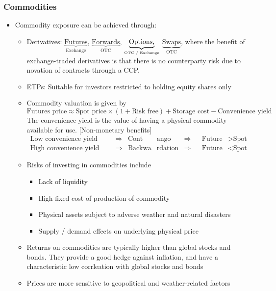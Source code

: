 \documentclass[../notes_compiled.tex]{subfiles}
\begin{document}
\subsubsection{Commodities}
\begin{itemize}
\item Commodity exposure can be achieved through:
\begin{itemize}
\item Derivatives: $\underbrace{\text{Futures}}_{\text{Exchange}}$,  $\underbrace{\text{Forwards}}_{\text{OTC}}$, $\underbrace{\text{Options,}}_{\text{\tiny{OTC / Exchange}}}$ $\underbrace{\text{Swaps}}_{\text{OTC}}$, where the benefit of exchange-traded derivatives is that there is no counterparty risk due to novation of contracts through a CCP.
\item ETPs: Suitable for investors restricted to holding equity shares only
\item Commodity valuation is given by
\small{\begin{equation}
\text{Futures price} \approx \text{Spot price} \times (1 + \text{Risk free}) + \text{Storage cost} - \text{Convenience yield}
\end{equation}}
The convenience yield is the value of having a physical commodity available for use. [Non-monetary benefits]
\begin{align*}
\text{Low convenience yield}& & &\Longrightarrow &  \text{Cont}&\text{ango} & \Longrightarrow && \text{Future}&> \text{Spot} \\
\text{High convenience yield}& & &\Longrightarrow & \text{Backwa}&\text{rdation}& \Longrightarrow && \text{Future}&<\text{Spot}
\end{align*}
\item Risks of investing in commodities include
\begin{itemize}
\item Lack of liquidity
\item High fixed cost of production of commodity
\item Physical assets subject to adverse weather and natural disasters
\item Supply / demand effects on underlying physical price
\end{itemize}

\item Returns on commodities are typically higher than global stocks and bonds. They provide a good hedge against inflation, and have a characteristic low corrleation with global stocks and bonds
\item Prices are more sensitive to geopolitical and weather-related factors
\end{itemize}
\end{itemize}
\end{document}
